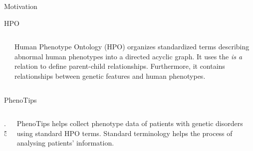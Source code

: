 \documentclass[final]{beamer} %
\begin{document}
\begin{frame}{}
\begin{columns}[T]
\begin{column}{0.3\linewidth}
\begin{block}{\Huge Motivation}
    \begin{block}{\Large HPO}
   \begin{columns}[T]
      \begin{column}{.5\textwidth}
      \centering
     \end{column}
     \begin{column}{.5\textwidth}
      \Large
      Human Phenotype Ontology (HPO) organizes standardized terms describing abnormal human phenotypes into a directed acyclic graph. It uses the  {\it{\Large is a}} relation to define parent-child relationships. Furthermore, it contains relationships between genetic features and human phenotypes.
     \end{column}
   \end{columns}
  \end{block}
  

   \begin{block}{\Large PhenoTips}
      \begin{columns}[T]
        \begin{column} {.5\textwidth}
           \vspace{1.5cm}
           \centering
        \end{column}
        
        \begin{column}{.5\textwidth}
          \Large
          PhenoTips helps collect phenotype data of patients with genetic disorders using standard HPO terms. Standard terminology helps the process of analysing patients' information. 
        \end{column}
      \end{columns}
    \end{block}


\end{block}
\end{column}
\end{columns}
\end{frame}
\end{document}
